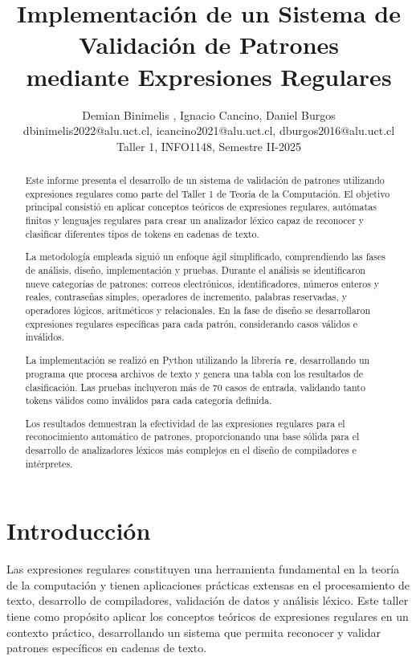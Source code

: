 \documentclass[10pt,letterpaper]{article}
\title{Implementación de un Sistema de Validación de Patrones\\mediante Expresiones Regulares}
\author{
Demian  Binimelis , Ignacio  Cancino, Daniel Burgos \\
dbinimelis2022@alu.uct.cl, icancino2021@alu.uct.cl, dburgos2016@alu.uct.cl \\
Taller 1, INFO1148, Semestre II-2025
}
\date{}
\begin{document}
\maketitle

\begin{abstract}
Este informe presenta el desarrollo de un sistema de validación de patrones utilizando expresiones regulares como parte del Taller 1 de Teoría de la Computación. El objetivo principal consistió en aplicar conceptos teóricos de expresiones regulares, autómatas finitos y lenguajes regulares para crear un analizador léxico capaz de reconocer y clasificar diferentes tipos de tokens en cadenas de texto.

La metodología empleada siguió un enfoque ágil simplificado, comprendiendo las fases de análisis, diseño, implementación y pruebas. Durante el análisis se identificaron nueve categorías de patrones: correos electrónicos, identificadores, números enteros y reales, contraseñas simples, operadores de incremento, palabras reservadas, y operadores lógicos, aritméticos y relacionales. En la fase de diseño se desarrollaron expresiones regulares específicas para cada patrón, considerando casos válidos e inválidos.

La implementación se realizó en Python utilizando la librería \texttt{re}, desarrollando un programa que procesa archivos de texto y genera una tabla con los resultados de clasificación. Las pruebas incluyeron más de 70 casos de entrada, validando tanto tokens válidos como inválidos para cada categoría definida.

Los resultados demuestran la efectividad de las expresiones regulares para el reconocimiento automático de patrones, proporcionando una base sólida para el desarrollo de analizadores léxicos más complejos en el diseño de compiladores e intérpretes.
\end{abstract}

\section{Introducción}

Las expresiones regulares constituyen una herramienta fundamental en la teoría de la computación y tienen aplicaciones prácticas extensas en el procesamiento de texto, desarrollo de compiladores, validación de datos y análisis léxico. Este taller tiene como propósito aplicar los conceptos teóricos de expresiones regulares en un contexto práctico, desarrollando un sistema que permita reconocer y validar patrones específicos en cadenas de texto.
\end{document}
